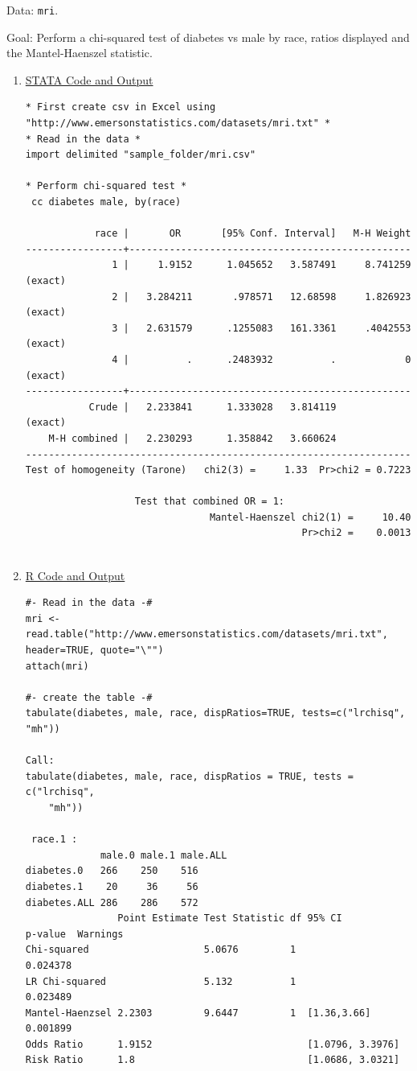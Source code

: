 \documentclass[11pt,letterpaper,fleqn]{report}
\begin{document}
Data: \texttt{mri}.

Goal: Perform a chi-squared test of diabetes vs male by race, ratios displayed and the Mantel-Haenszel statistic.

\begin{enumerate}[]
\item \underline{STATA Code and Output}
{\scriptsize
\begin{verbatim}
* First create csv in Excel using "http://www.emersonstatistics.com/datasets/mri.txt" *
* Read in the data *
import delimited "sample_folder/mri.csv"

* Perform chi-squared test *
 cc diabetes male, by(race)

            race |       OR       [95% Conf. Interval]   M-H Weight
-----------------+-------------------------------------------------
               1 |     1.9152      1.045652   3.587491     8.741259 (exact)
               2 |   3.284211       .978571   12.68598     1.826923 (exact)
               3 |   2.631579      .1255083   161.3361     .4042553 (exact)
               4 |          .      .2483932          .            0 (exact)
-----------------+-------------------------------------------------
           Crude |   2.233841      1.333028   3.814119              (exact)
    M-H combined |   2.230293      1.358842   3.660624              
-------------------------------------------------------------------
Test of homogeneity (Tarone)   chi2(3) =     1.33  Pr>chi2 = 0.7223

                   Test that combined OR = 1:
                                Mantel-Haenszel chi2(1) =     10.40
                                                Pr>chi2 =    0.0013


\end{verbatim}}


\item \underline{R Code and Output}
{\scriptsize
\begin{verbatim}
#- Read in the data -#
mri <- read.table("http://www.emersonstatistics.com/datasets/mri.txt", header=TRUE, quote="\"")
attach(mri)

#- create the table -#
tabulate(diabetes, male, race, dispRatios=TRUE, tests=c("lrchisq", "mh"))

Call:
tabulate(diabetes, male, race, dispRatios = TRUE, tests = c("lrchisq", 
    "mh"))

 race.1 : 
             male.0 male.1 male.ALL
diabetes.0   266    250    516     
diabetes.1    20     36     56     
diabetes.ALL 286    286    572     
                Point Estimate Test Statistic df 95% CI           p-value  Warnings
Chi-squared                    5.0676         1                   0.024378         
LR Chi-squared                 5.132          1                   0.023489         
Mantel-Haenzsel 2.2303         9.6447         1  [1.36,3.66]      0.001899         
Odds Ratio      1.9152                           [1.0796, 3.3976]                  
Risk Ratio      1.8                              [1.0686, 3.0321]                  


\end{verbatim}}
\end{enumerate}
\end{document}
